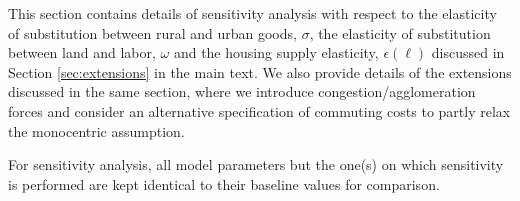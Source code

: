 \documentclass[11pt]{report}
\begin{document}



This section contains details of sensitivity analysis with respect to the elasticity of substitution between rural and urban goods, $\sigma$, the elasticity of substitution between land and labor, $\omega$ and the housing supply elasticity, $\epsilon(\ell)$ discussed in Section \ref{sec:extensions} in the main text. We also provide details of the extensions discussed in the same section, where we introduce congestion/agglomeration forces and consider an alternative specification of commuting costs to partly relax the monocentric assumption. 

For sensitivity analysis, all model parameters but the one(s) on which sensitivity is performed are kept identical to their baseline values for comparison. %
\end{document}
